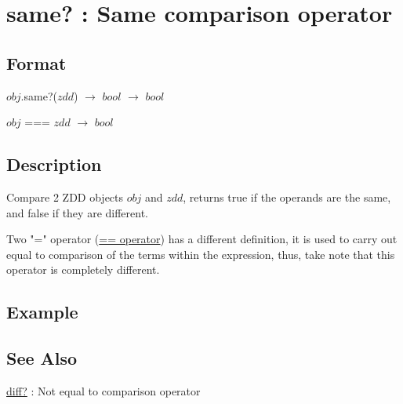 
\section{same? : Same comparison operator \label{sect:same?}}
\subsection*{Format}
$obj$.same?($zdd$)  $\rightarrow$ $bool$ $\rightarrow$ $bool$

$obj$ === $zdd$ $\rightarrow$ $bool$

\subsection*{Description}
Compare 2 ZDD objects $obj$ and $zdd$, returns true if the operands are the same, and false if they are different. 

Two "=" operator (\hyperref[sect:eq]{== operator}) has a different definition, it is used to carry out equal to comparison of the terms within the expression, thus, take note that this operator is completely different. 

\subsection*{Example}


\subsection*{See Also}
\hyperref[sect:diff?]{diff?} : Not equal to comparison operator
